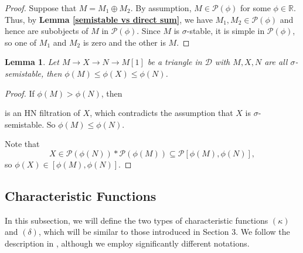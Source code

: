 \documentclass[a4paper,12pt]{amsart}
\newtheorem{lemma}[theorem]{Lemma}
\begin{document}
\begin{proof}
    Suppose that $M=M_1\oplus M_2$. By assumption, $M\in\mathcal{P}(\phi)$ for some $\phi\in\mathbb{R}$. Thus, by \textbf{Lemma \ref{semistable vs direct sum}}, we have $M_1,M_2\in\mathcal{P}(\phi)$ and hence are subobjects of $M$ in $\mathcal{P}(\phi)$. Since $M$ is $\sigma$-stable, it is simple in $\mathcal{P}(\phi)$, so one of $M_1$ and $M_2$ is zero and the other is $M$.
\end{proof}
\begin{lemma}\label{phase increasing}
    Let $M\rightarrow X\rightarrow N\rightarrow M[1]$ be a triangle in $\mathcal{D}$ with $M,X,N$ are all $\sigma$-semistable, then $\phi(M)\leqslant\phi(X)\leqslant\phi(N)$.
\end{lemma}
\begin{proof}
    If $\phi(M)>\phi(N)$, then
    \begin{center}
    \end{center}
    is an HN filtration of $X$, which contradicts the assumption that $X$ is $\sigma$-semistable. So $\phi(M)\leqslant\phi(N)$.

    Note that
    \[X\in\mathcal{P}(\phi(N))*\mathcal{P}(\phi(M))\subseteq\mathcal{P}[\phi(M),\phi(N)],\]
    so $\phi(X)\in[\phi(M),\phi(N)]$.
\end{proof}
\subsection{Characteristic Functions}
In this subsection, we will define the two types of characteristic functions $(\kappa)$ and $(\delta)$, which will be similar to those introduced in Section 3. We follow the description in \cite{WC2023}, although we employ significantly different notations.
\end{document}
